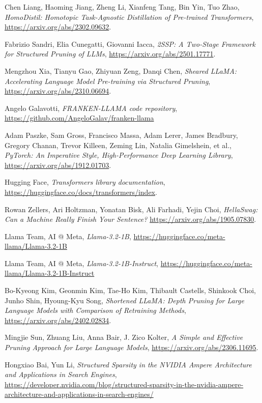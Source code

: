 \begin{thebibliography}{9}
	Chen Liang, Haoming Jiang, Zheng Li, Xianfeng Tang, Bin Yin, Tuo Zhao,
	\textit{HomoDistil: Homotopic Task-Agnostic Distillation of Pre-trained Transformers},
	\url{https://arxiv.org/abs/2302.09632}.

	Fabrizio Sandri, Elia Cunegatti, Giovanni Iacca,
	\textit{2SSP: A Two-Stage Framework for Structured Pruning of LLMs},
	\url{https://arxiv.org/abs/2501.17771}.

	Mengzhou Xia, Tianyu Gao, Zhiyuan Zeng, Danqi Chen,
	\textit{Sheared LLaMA: Accelerating Language Model Pre-training via Structured Pruning},
	\url{https://arxiv.org/abs/2310.06694}.

	Angelo Galavotti,
	\textit{FRANKEN-LLAMA code repository},
	\url{https://github.com/AngeloGalav/franken-llama}

	Adam Paszke, Sam Gross, Francisco Massa, Adam Lerer, James Bradbury, Gregory Chanan, Trevor Killeen, Zeming Lin, Natalia Gimelshein, et al.,
	\textit{PyTorch: An Imperative Style, High-Performance Deep Learning Library},
	\url{https://arxiv.org/abs/1912.01703}.

	Hugging Face,
	\textit{Transformers library documentation},
	\url{https://huggingface.co/docs/transformers/index}.

	Rowan Zellers, Ari Holtzman, Yonatan Bisk, Ali Farhadi, Yejin Choi,
	\textit{HellaSwag: Can a Machine Really Finish Your Sentence?}
	\url{https://arxiv.org/abs/1905.07830}.

	Llama Team, AI @ Meta,
	\textit{Llama-3.2-1B},
	\url{https://huggingface.co/meta-llama/Llama-3.2-1B}

	Llama Team, AI @ Meta,
	\textit{Llama-3.2-1B-Instruct},
	\url{https://huggingface.co/meta-llama/Llama-3.2-1B-Instruct}

	Bo-Kyeong Kim, Geonmin Kim, Tae-Ho Kim, Thibault Castells, Shinkook Choi, Junho Shin, Hyoung-Kyu Song,
	\textit{Shortened LLaMA: Depth Pruning for Large Language Models with Comparison of Retraining Methods},
	\url{https://arxiv.org/abs/2402.02834}.

	Mingjie Sun, Zhuang Liu, Anna Bair, J. Zico Kolter,
	\textit{A Simple and Effective Pruning Approach for Large Language Models},
	\url{https://arxiv.org/abs/2306.11695}.

	Hongxiao Bai, Yun Li,
	\textit{Structured Sparsity in the NVIDIA Ampere Architecture and Applications in Search Engines},
	\url{https://developer.nvidia.com/blog/structured-sparsity-in-the-nvidia-ampere-architecture-and-applications-in-search-engines/}


\end{thebibliography}
